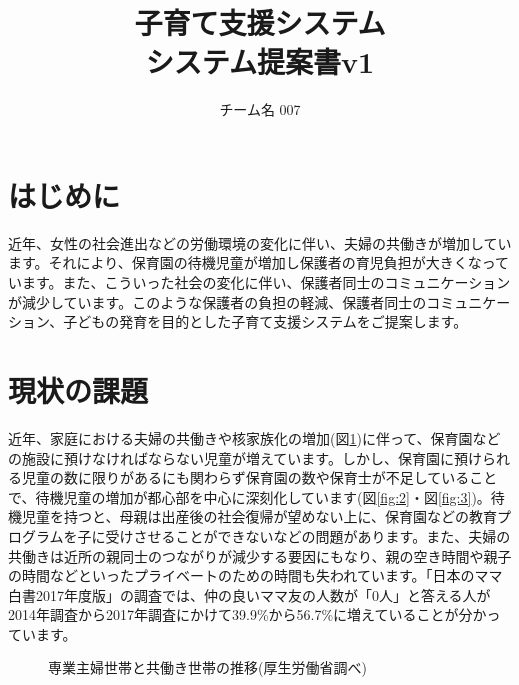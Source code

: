 \documentclass[a4j]{jarticle}
\title{
\vspace{30mm}
{\bf 子育て支援システム}
\\
\vspace{5mm}
{\bf システム提案書v1\\
}
\vspace{120mm}
}
\author{
\vspace{5mm}
チーム名 007\\
\vspace{5mm}
}
\begin{document}
\maketitle
\tableofcontents
\newpage

\section{はじめに}
近年、女性の社会進出などの労働環境の変化に伴い、夫婦の共働きが増加しています。それにより、保育園の待機児童が増加し保護者の育児負担が大きくなっています。また、こういった社会の変化に伴い、保護者同士のコミュニケーションが減少しています。このような保護者の負担の軽減、保護者同士のコミュニケーション、子どもの発育を目的とした子育て支援システムをご提案します。

\section{現状の課題}
近年、家庭における夫婦の共働きや核家族化の増加(図\ref{fig:1})\cite{bib:tomo}に伴って、保育園などの施設に預けなければならない児童が増えています。しかし、保育園に預けられる児童の数に限りがあるにも関わらず保育園の数や保育士が不足していることで、待機児童の増加が都心部を中心に深刻化しています(図\ref{fig:2}・図\ref{fig:3})\cite{bib:taiki}。待機児童を持つと、母親は出産後の社会復帰が望めない上に、保育園などの教育プログラムを子に受けさせることができないなどの問題があります。また、夫婦の共働きは近所の親同士のつながりが減少する要因にもなり、親の空き時間や親子の時間などといったプライベートのための時間も失われています。「日本のママ白書2017年度版」\cite{bib:mama}の調査では、仲の良いママ友の人数が「0人」と答える人が2014年調査から2017年調査にかけて39.9\%から56.7\%に増えていることが分かっています。

\begin{figure}[H]
\begin{center}
\caption{専業主婦世帯と共働き世帯の推移(厚生労働省調べ)}
\label{fig:1}
\end{center}
\end{figure}
\end{document}
